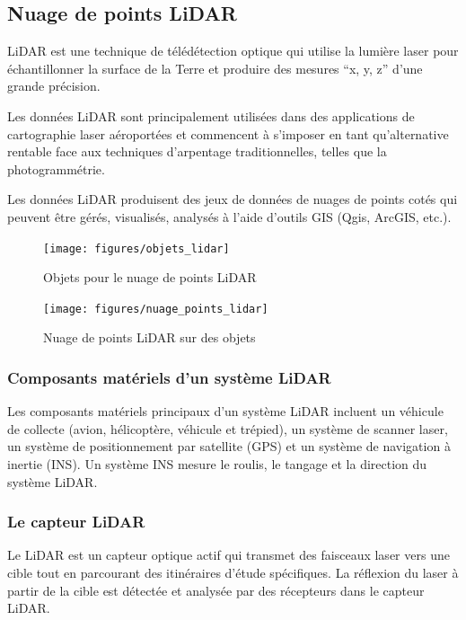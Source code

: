 \subsection{Nuage de points LiDAR}

LiDAR \citep{esri_lidar} est une technique de télédétection optique qui utilise la lumière laser pour échantillonner la surface de la Terre et produire des mesures ``x, y, z'' d'une grande précision.

Les données LiDAR sont principalement utilisées dans des applications de cartographie laser aéroportées et commencent à s'imposer en tant qu'alternative rentable face aux techniques d'arpentage traditionnelles, telles que la photogrammétrie.

Les données LiDAR produisent des jeux de données de nuages de points cotés qui peuvent être gérés, visualisés, analysés à l'aide d'outils GIS (Qgis, ArcGIS, etc.).

\begin{figure}[htbp]
    \centering
    \texttt{[image: figures/objets\_lidar]}
    \caption{Objets pour le nuage de points LiDAR \citep{cadden_2021}}
    \label{fig:objets_lidar}
\end{figure}

\begin{figure}[htbp]
    \centering
    \texttt{[image: figures/nuage\_points\_lidar]}
    \caption{Nuage de points LiDAR sur des objets \citep{cadden_2021}}
    \label{fig:nuage_points_lidar}
\end{figure}

\subsubsection{Composants matériels d'un système LiDAR}

Les composants matériels principaux d'un système LiDAR incluent un véhicule de collecte (avion, hélicoptère, véhicule et trépied), un système de scanner laser, un système de positionnement par satellite (GPS) et un système de navigation à inertie (INS). Un système INS mesure le roulis, le tangage et la direction du système LiDAR.

\subsubsection{Le capteur LiDAR}

Le LiDAR est un capteur optique actif qui transmet des faisceaux laser vers une cible tout en parcourant des itinéraires d'étude spécifiques. La réflexion du laser à partir de la cible est détectée et analysée par des récepteurs dans le capteur LiDAR.

